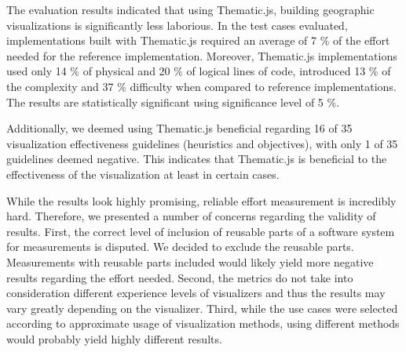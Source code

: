 The evaluation results indicated that using Thematic.js, building geographic visualizations is significantly less laborious. In the test cases evaluated, implementations built with Thematic.js required an average of 7 \% of the effort needed for the reference implementation. Moreover, Thematic.js implementations used only 14 \% of physical and 20 \% of logical lines of code, introduced 13 \% of the complexity and 37 \% difficulty when compared to reference implementations. The results are statistically significant using significance level of 5 \%. 

Additionally, we deemed using Thematic.js beneficial regarding 16 of 35 visualization effectiveness guidelines (heuristics and objectives), with only 1 of 35 guidelines deemed negative. This indicates that Thematic.js is beneficial to the effectiveness of the visualization at least in certain cases.

While the results look highly promising, reliable effort measurement is incredibly hard. Therefore, we presented a number of concerns regarding the validity of results. First, the correct level of inclusion of reusable parts of a software system for measurements is disputed. We decided to exclude the reusable parts. Measurements with reusable parts included would likely yield more negative results regarding the effort needed. Second, the metrics do not take into consideration different experience levels of visualizers and thus the results may vary greatly depending on the visualizer. Third, while the use cases were selected according to approximate usage of visualization methods, using different methods would probably yield highly different results.

